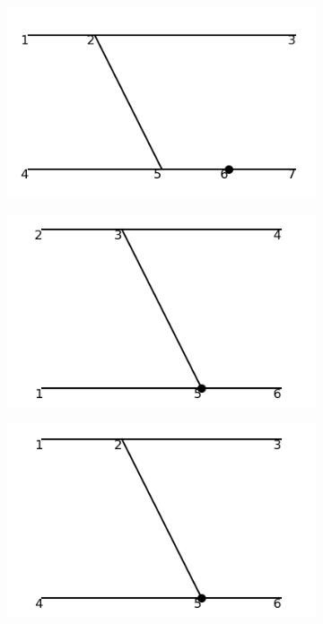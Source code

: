 \documentclass[11pt,a4paper,twoside,pdf]{article}
\numberwithin{equation}{section}
\begin{document}
\begin{figure}[h!]
\begin{subfigure}[t]{0.16\textwidth}
    \end{subfigure}
    \hfill
    \begin{subfigure}[t]{0.16\textwidth}
        \centering
        \includegraphics[width=\textwidth]{plots/order4_2to2/counterterms/16.png}
    \end{subfigure}
    \hfill
    \begin{subfigure}[t]{0.16\textwidth}
        \centering
        \includegraphics[width=\textwidth]{plots/order4_2to2/counterterms/17.png}
    \end{subfigure}
    \hfill  
    \begin{subfigure}[t]{0.16\textwidth}
        \centering
        \includegraphics[width=\textwidth]{plots/order4_2to2/counterterms/18.png}

\end{subfigure}
\end{figure}
\end{document}
